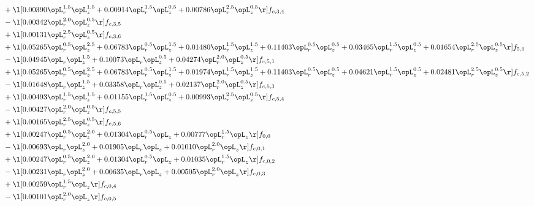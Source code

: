 \begin{alignat}{2}
& + \l[  0.00390 \opL_r^{1.5} \opL_z^{1.5} +  0.00914 \opL_r^{1.5} \opL_z^{0.5} +  0.00786 \opL_r^{2.5} \opL_z^{0.5}  \r] f_{c,3,4} \nonumber \\ 
& - \l[  0.00342 \opL_r^{2.0} \opL_z^{0.5}  \r] f_{c,3,5} \nonumber \\ 
& + \l[  0.00131 \opL_r^{2.5} \opL_z^{0.5}  \r] f_{c,3,6} \nonumber \\ 
& + \l[  0.05265 \opL_r^{0.5} \opL_z^{2.5} +  0.06783 \opL_r^{0.5} \opL_z^{1.5} +  0.01480 \opL_r^{1.5} \opL_z^{1.5} +  0.11403 \opL_r^{0.5} \opL_z^{0.5} +  0.03465 \opL_r^{1.5} \opL_z^{0.5} +  0.01654 \opL_r^{2.5} \opL_z^{0.5}  \r] f_{5,0} \nonumber \\ 
& - \l[  0.04945 \opL_r \opL_z^{1.5} +  0.10073 \opL_r \opL_z^{0.5} +  0.04274 \opL_r^{2.0} \opL_z^{0.5}  \r] f_{c,5,1} \nonumber \\ 
& + \l[  0.05265 \opL_r^{0.5} \opL_z^{2.5} +  0.06783 \opL_r^{0.5} \opL_z^{1.5} +  0.01974 \opL_r^{1.5} \opL_z^{1.5} +  0.11403 \opL_r^{0.5} \opL_z^{0.5} +  0.04621 \opL_r^{1.5} \opL_z^{0.5} +  0.02481 \opL_r^{2.5} \opL_z^{0.5}  \r] f_{c,5,2} \nonumber \\ 
& - \l[  0.01648 \opL_r \opL_z^{1.5} +  0.03358 \opL_r \opL_z^{0.5} +  0.02137 \opL_r^{2.0} \opL_z^{0.5}  \r] f_{c,5,3} \nonumber \\ 
& + \l[  0.00493 \opL_r^{1.5} \opL_z^{1.5} +  0.01155 \opL_r^{1.5} \opL_z^{0.5} +  0.00993 \opL_r^{2.5} \opL_z^{0.5}  \r] f_{c,5,4} \nonumber \\ 
& - \l[  0.00427 \opL_r^{2.0} \opL_z^{0.5}  \r] f_{c,5,5} \nonumber \\ 
& + \l[  0.00165 \opL_r^{2.5} \opL_z^{0.5}  \r] f_{c,5,6} \nonumber \\ 
& + \l[  0.00247 \opL_r^{0.5} \opL_z^{2.0} +  0.01304 \opL_r^{0.5} \opL_z +  0.00777 \opL_r^{1.5} \opL_z  \r] f_{0,0} \nonumber \\ 
& - \l[  0.00693 \opL_r \opL_z^{2.0} +  0.01905 \opL_r \opL_z +  0.01010 \opL_r^{2.0} \opL_z  \r] f_{c,0,1} \nonumber \\ 
& + \l[  0.00247 \opL_r^{0.5} \opL_z^{2.0} +  0.01304 \opL_r^{0.5} \opL_z +  0.01035 \opL_r^{1.5} \opL_z  \r] f_{c,0,2} \nonumber \\ 
& - \l[  0.00231 \opL_r \opL_z^{2.0} +  0.00635 \opL_r \opL_z +  0.00505 \opL_r^{2.0} \opL_z  \r] f_{c,0,3} \nonumber \\ 
& + \l[  0.00259 \opL_r^{1.5} \opL_z  \r] f_{c,0,4} \nonumber \\ 
& - \l[  0.00101 \opL_r^{2.0} \opL_z  \r] f_{c,0,5} \nonumber \\ 

\end{alignat}

